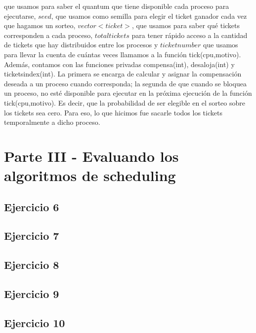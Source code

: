 \documentclass[a4paper]{article}
\begin{document}
que usamos para saber el quantum que tiene disponible cada proceso para ejecutarse, $seed$, que
usamos como semilla para elegir el ticket ganador cada vez que hagamos un sorteo, $vector<ticket>$, que
usamos para saber qu\'e tickets corresponden a cada proceso, $totaltickets$ para tener r\'apido acceso
a la cantidad de tickets que hay distribuidos entre los procesos y $ticketnumber$ que usamos para 
llevar la cuenta de cu\'antas veces llamamos a la funci\'on tick(cpu,motivo). Adem\'as, contamos con 
las funciones privadas compensa(int), desaloja(int) y ticketsindex(int). La primera se encarga de
calcular y asignar la compensaci\'on deseada a un proceso cuando corresponda; la segunda de que cuando
se bloquea un proceso, no est\'e disponible para ejecutar en la pr\'oxima ejecuci\'on de la funci\'on
tick(cpu,motivo). Es decir, que la probabilidad de ser elegible en el sorteo sobre los tickets sea cero.
Para eso, lo que hicimos fue sacarle todos los tickets temporalmente a dicho proceso. \\ 






\section{Parte III - Evaluando los algoritmos de scheduling}

\subsection{Ejercicio 6}
\subsection{Ejercicio 7}
\subsection{Ejercicio 8}
\subsection{Ejercicio 9}
\subsection{Ejercicio 10}
\end{document}
